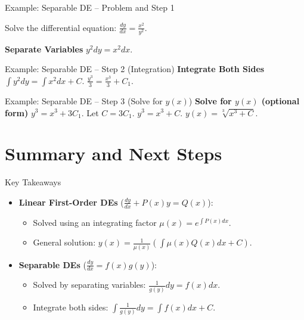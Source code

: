\documentclass[10pt,aspectratio=169]{beamer}
\begin{document}
\begin{frame}{Example: Separable DE -- Problem and Step 1}
    \begin{problembox}
        Solve the differential equation: $\frac{dy}{dx} = \frac{x^2}{y^2}$.
    \end{problembox}
    \vspace{1em}
    \textbf{Separate Variables}
    $y^2 dy = x^2 dx$.
\end{frame}

\begin{frame}{Example: Separable DE -- Step 2 (Integration)}
    \textbf{Integrate Both Sides}
    $\int y^2 dy = \int x^2 dx + C$.
    $\frac{y^3}{3} = \frac{x^3}{3} + C_1$.
\end{frame}

\begin{frame}{Example: Separable DE -- Step 3 (Solve for $y(x)$)}
    \textbf{Solve for $y(x)$ (optional form)}
    $y^3 = x^3 + 3C_1$. Let $C = 3C_1$.
    $y^3 = x^3 + C$.
    $y(x) = \sqrt[3]{x^3 + C}$.
\end{frame}

\section{Summary and Next Steps}

\begin{frame}{Key Takeaways}
    \begin{itemize}
        \item \textbf{Linear First-Order DEs} ($\frac{dy}{dx} + P(x)y = Q(x)$):
        \begin{itemize}
            \item Solved using an integrating factor $\mu(x) = e^{\int P(x)dx}$.
            \item General solution: $y(x) = \frac{1}{\mu(x)} \left( \int \mu(x)Q(x)dx + C \right)$.
        \end{itemize}
        \item \textbf{Separable DEs} ($\frac{dy}{dx} = f(x)g(y)$):
        \begin{itemize}
            \item Solved by separating variables: $\frac{1}{g(y)}dy = f(x)dx$.
            \item Integrate both sides: $\int \frac{1}{g(y)}dy = \int f(x)dx + C$.
        \end{itemize}
    \end{itemize}
\end{frame}
\end{document}
